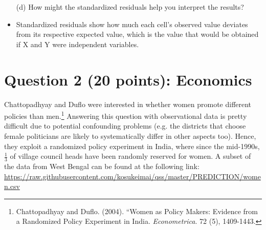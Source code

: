 \documentclass[12pt,letterpaper]{article}
\begin{document}
\begin{itemize}
\begin{table}[h]
\begin{tabular}{l | c c c }
		\end{tabular}
	\end{table}
	
	
	\vspace{2cm}
	\item [(d)] How might the standardized residuals help you interpret the results?  
	\item
	Standardized residuals show how much each cell's observed value deviates from its respective expected value, which is the value that would be obtained if X and Y were independent variables.
	
\end{itemize}


\section*{Question 2 (20 points): Economics}
Chattopadhyay and Duflo were interested in whether women promote different policies than men.\footnote{Chattopadhyay and Duflo. (2004). ``Women as Policy Makers: Evidence from a Randomized Policy Experiment in India. \textit{Econometrica}. 72 (5), 1409-1443.} Answering this question with observational data is pretty difficult due to potential confounding problems (e.g. the districts that choose female politicians are likely to systematically differ in other aspects too). Hence, they exploit a randomized policy experiment in India, where since the mid-1990s, $\frac{1}{3}$ of village council heads have been randomly reserved for women. A subset of the data from West Bengal can be found at the following link: \url{https://raw.githubusercontent.com/kosukeimai/qss/master/PREDICTION/women.csv}\\
\end{document}
